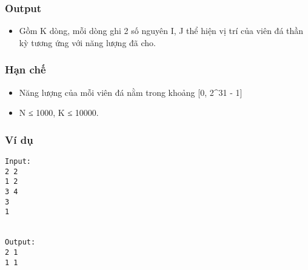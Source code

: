 \subsubsection{   Output  }
\begin{itemize}
	\item     Gồm K dòng, mỗi dòng ghi 2 số nguyên I, J thể hiện vị trí của viên đá thần kỳ tương ứng với năng lượng đã cho.   
\end{itemize}

\subsubsection{   Hạn chế  }
\begin{itemize}
	\item     Năng lượng của mỗi viên đá nằm trong khoảng [0, 2\textasciicircum31 - 1]   
	\item     N ≤ 1000, K ≤ 10000.   
\end{itemize}

\subsubsection{   Ví dụ  }
\begin{verbatim}
Input:
2 2
1 2
3 4
3
1


Output:
2 1
1 1

\end{verbatim}
